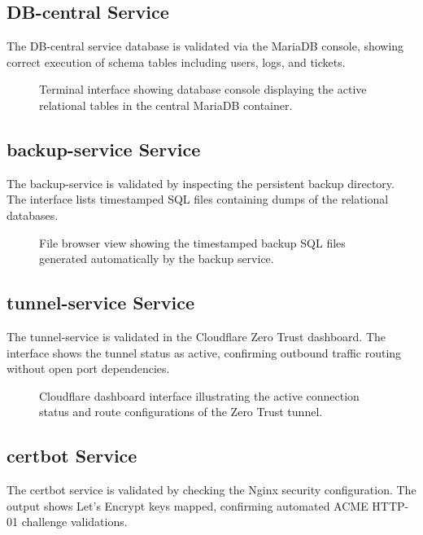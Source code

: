 \documentclass[12pt]{article}
\begin{document}
\subsection{DB-central Service}
The DB-central service database is validated via the MariaDB console, showing correct execution of schema tables including users, logs, and tickets.

\begin{figure}[htbp]
    \centering
    \caption{Terminal interface showing database console displaying the active relational tables in the central MariaDB container.}
    \label{fig:database_console}
\end{figure}

\subsection{backup-service Service}
The backup-service is validated by inspecting the persistent backup directory. The interface lists timestamped SQL files containing dumps of the relational databases.

\begin{figure}[htbp]
    \centering
    \caption{File browser view showing the timestamped backup SQL files generated automatically by the backup service.}
    \label{fig:backups_list}
\end{figure}

\subsection{tunnel-service Service}
The tunnel-service is validated in the Cloudflare Zero Trust dashboard. The interface shows the tunnel status as active, confirming outbound traffic routing without open port dependencies.

\begin{figure}[htbp]
    \centering
    \caption{Cloudflare dashboard interface illustrating the active connection status and route configurations of the Zero Trust tunnel.}
    \label{fig:cloudflare_tunnel}
\end{figure}

\subsection{certbot Service}
The certbot service is validated by checking the Nginx security configuration. The output shows Let's Encrypt keys mapped, confirming automated ACME HTTP-01 challenge validations.
\end{document}
